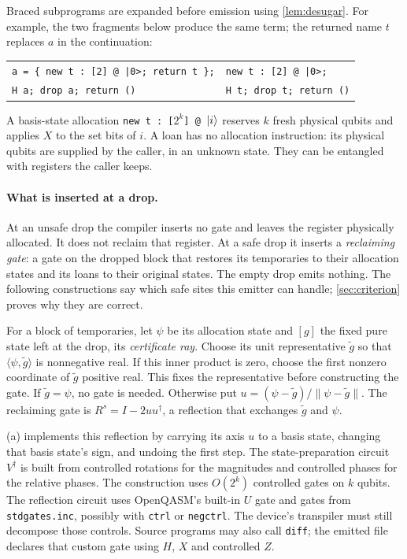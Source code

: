 \documentclass[acmsmall,screen,review,anonymous,nonacm]{acmart}
\begin{document}
Braced subprograms are expanded before emission using
\cref{lem:desugar}. For example, the two fragments below produce the same
term; the returned name $t$ replaces $a$ in the continuation:
\begin{center}\small
\begin{tabular}{@{}l@{\qquad$\longmapsto$\qquad}l@{}}
\texttt{a = \{ new t : [2] @ |0>; return t \};} & \texttt{new t : [2] @ |0>;}\\
\texttt{H a; drop a; return ()} & \texttt{H t; drop t; return ()}
\end{tabular}
\end{center}
A basis-state allocation \texttt{new t : [$2^k$] @ $\lvert i \rangle$} reserves
$k$ fresh physical qubits and applies $X$ to the set bits of $i$.
A loan has no allocation instruction: its physical qubits are supplied by
the caller, in an unknown state. They can be entangled with registers the
caller keeps.

\paragraph{What is inserted at a drop.}
At an unsafe drop the compiler inserts no gate and leaves the register
physically allocated. It does not reclaim that register. At a safe drop it inserts a
\emph{reclaiming gate}: a gate on the dropped block that restores its
temporaries to their allocation states and its loans to their original
states. The empty drop emits nothing. The following constructions say
which safe sites this emitter can handle; \cref{sec:criterion} proves why
they are correct.

For a block of temporaries, let $\psi$ be its allocation state and $[g]$
the fixed pure state left at the drop, its \emph{certificate ray}.
Choose its unit representative $\tilde g$ so that
$\langle\psi,\tilde g\rangle$ is nonnegative real. If this inner product
is zero, choose the first nonzero coordinate of $\tilde g$ positive real.
This fixes the representative before constructing the gate.
If $\tilde g=\psi$, no gate is needed. Otherwise put
$u=(\psi-\tilde g)/\|\psi-\tilde g\|$. The reclaiming gate is
$R^s=I-2uu^{\dagger}$, a reflection that exchanges $\tilde g$ and $\psi$.

(a) implements this reflection by carrying its
axis $u$ to a basis state, changing that basis state's sign, and undoing
the first step. The state-preparation circuit $V^{\dagger}$ is built
from controlled rotations for the magnitudes and controlled phases for
the relative phases. The construction uses $O(2^k)$ controlled gates on
$k$ qubits. The reflection circuit uses OpenQASM's built-in $U$ gate and gates
from \texttt{stdgates.inc}, possibly with \texttt{ctrl} or \texttt{negctrl}.
The device's transpiler must still decompose those controls. Source
programs may also call \texttt{diff}; the emitted file declares that
custom gate using $H$, $X$ and controlled $Z$.
\end{document}
